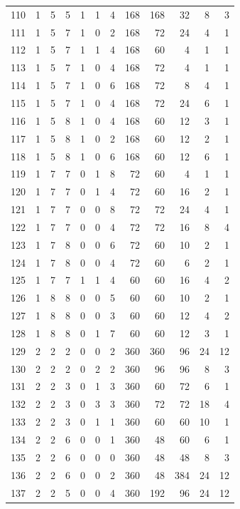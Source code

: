 \documentclass[11pt,a4paper]{article}
\begin{document}
\begin{longtable}{r|rrr|rrr|rrr|rr}
110 & 1 & 5 & 5 & 1 & 1 & 4 & 168 & 168 & 32 & 8 & 3\\
111 & 1 & 5 & 7 & 1 & 0 & 2 & 168 & 72 & 24 & 4 & 1\\
112 & 1 & 5 & 7 & 1 & 1 & 4 & 168 & 60 & 4 & 1 & 1\\
113 & 1 & 5 & 7 & 1 & 0 & 4 & 168 & 72 & 4 & 1 & 1\\
114 & 1 & 5 & 7 & 1 & 0 & 6 & 168 & 72 & 8 & 4 & 1\\
115 & 1 & 5 & 7 & 1 & 0 & 4 & 168 & 72 & 24 & 6 & 1\\
116 & 1 & 5 & 8 & 1 & 0 & 4 & 168 & 60 & 12 & 3 & 1\\
117 & 1 & 5 & 8 & 1 & 0 & 2 & 168 & 60 & 12 & 2 & 1\\
118 & 1 & 5 & 8 & 1 & 0 & 6 & 168 & 60 & 12 & 6 & 1\\
119 & 1 & 7 & 7 & 0 & 1 & 8 & 72 & 60 & 4 & 1 & 1\\
120 & 1 & 7 & 7 & 0 & 1 & 4 & 72 & 60 & 16 & 2 & 1\\
121 & 1 & 7 & 7 & 0 & 0 & 8 & 72 & 72 & 24 & 4 & 1\\
122 & 1 & 7 & 7 & 0 & 0 & 4 & 72 & 72 & 16 & 8 & 4\\
123 & 1 & 7 & 8 & 0 & 0 & 6 & 72 & 60 & 10 & 2 & 1\\
124 & 1 & 7 & 8 & 0 & 0 & 4 & 72 & 60 & 6 & 2 & 1\\
125 & 1 & 7 & 7 & 1 & 1 & 4 & 60 & 60 & 16 & 4 & 2\\
126 & 1 & 8 & 8 & 0 & 0 & 5 & 60 & 60 & 10 & 2 & 1\\
127 & 1 & 8 & 8 & 0 & 0 & 3 & 60 & 60 & 12 & 4 & 2\\
128 & 1 & 8 & 8 & 0 & 1 & 7 & 60 & 60 & 12 & 3 & 1\\
129 & 2 & 2 & 2 & 0 & 0 & 2 & 360 & 360 & 96 & 24 & 12\\
130 & 2 & 2 & 2 & 0 & 2 & 2 & 360 & 96 & 96 & 8 & 3\\
131 & 2 & 2 & 3 & 0 & 1 & 3 & 360 & 60 & 72 & 6 & 1\\
132 & 2 & 2 & 3 & 0 & 3 & 3 & 360 & 72 & 72 & 18 & 4\\
133 & 2 & 2 & 3 & 0 & 1 & 1 & 360 & 60 & 60 & 10 & 1\\
134 & 2 & 2 & 6 & 0 & 0 & 1 & 360 & 48 & 60 & 6 & 1\\
135 & 2 & 2 & 6 & 0 & 0 & 0 & 360 & 48 & 48 & 8 & 3\\
136 & 2 & 2 & 6 & 0 & 0 & 2 & 360 & 48 & 384 & 24 & 12\\
137 & 2 & 2 & 5 & 0 & 0 & 4 & 360 & 192 & 96 & 24 & 12\\

\end{longtable}
\end{document}
